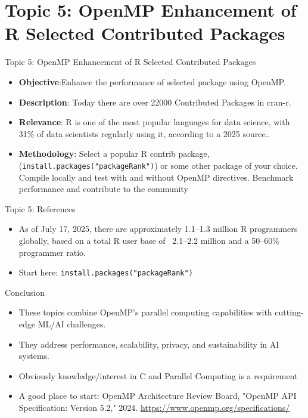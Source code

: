 \documentclass{beamer}
\begin{document}
\section{Topic 5: OpenMP Enhancement of R Selected Contributed Packages}
\begin{frame}{Topic 5: OpenMP Enhancement of R Selected Contributed Packages}
\begin{itemize}
    \item \textbf{Objective}:Enhance the performance of selected package using OpenMP.
    \item \textbf{Description}: Today there are over 22000 Contributed Packages in cran-r.
    \item \textbf{Relevance}: R is one of the most popular languages for data science, with 31\% 
    of data scientists regularly using it, according to a 2025 source..
    \item \textbf{Methodology}: Select a popular R contrib package, 
    (\texttt{install.packages("packageRank")}) or some other package of your choice. Compile locally and test with and without
    OpenMP directives. Benchmark performance and contribute to the community
\end{itemize}
\end{frame}

\begin{frame}{Topic 5: References}
\begin{itemize}
    \item As of July 17, 2025, there are approximately 1.1–1.3 
million R programmers globally, based on a total R user base of ~2.1–2.2 
million and a 50–60\% programmer ratio.        
    \item Start here: \texttt{install.packages("packageRank")}
\end{itemize}
\end{frame}

\begin{frame}{Conclusion}
\begin{itemize}
    \item These topics combine OpenMP's parallel computing capabilities with cutting-edge ML/AI challenges.
    \item They address performance, scalability, privacy, and sustainability in AI systems.
    \item Obviously knowledge/interest in C and Parallel Computing
    is a requirement
    \item A good place to start: OpenMP Architecture Review Board, "OpenMP API Specification: Version 5.2," 2024. \url{https://www.openmp.org/specifications/}
\end{itemize}
\end{frame}
\end{document}
